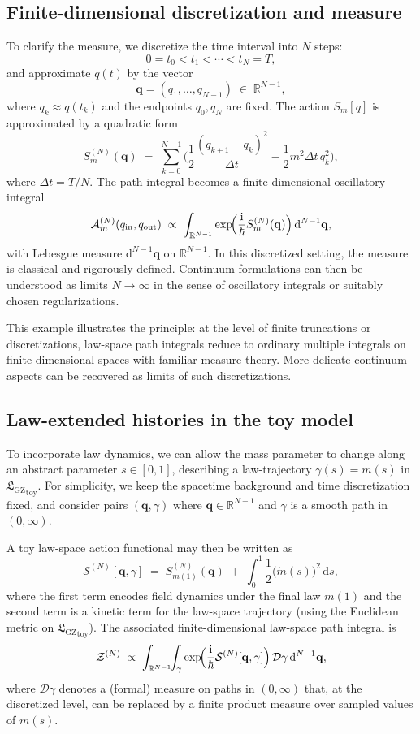 \documentclass[11pt]{book}
\newcommand{\GZLS}{\ensuremath{\mathfrak{L}_{\mathrm{GZ}}}}
\theoremstyle{plain}
\theoremstyle{definition}
\theoremstyle{remark}
\begin{document}
\subsection*{Finite-dimensional discretization and measure}

To clarify the measure, we discretize the time interval into $N$
steps:
\[
   0 = t_0 < t_1 < \cdots < t_N = T,
\]
and approximate $q(t)$ by the vector
\[
   \mathbf{q} = (q_1,\dots,q_{N-1}) \;\in\; \mathbb{R}^{N-1},
\]
where $q_k \approx q(t_k)$ and the endpoints $q_0,q_N$ are fixed.
The action $S_m[q]$ is approximated by a quadratic form
\[
   S_m^{(N)}(\mathbf{q})
   \;=\;
   \sum_{k=0}^{N-1}
   \biggl(
     \frac{1}{2}\frac{(q_{k+1}-q_k)^2}{\Delta t}
     - \frac{1}{2} m^2 \Delta t \, q_k^2
   \biggr),
\]
where $\Delta t = T/N$. The path integral becomes a finite-dimensional
oscillatory integral
\[
   \mathcal{A}_m^{(N)}(q_{\mathrm{in}},q_{\mathrm{out}})
   \;\propto\;
   \int_{\mathbb{R}^{N-1}}
   \exp\!\Bigl(\frac{\mathrm{i}}{\hbar}
   S_m^{(N)}(\mathbf{q})\Bigr)\,\mathrm{d}^{N-1}\mathbf{q},
\]
with Lebesgue measure $\mathrm{d}^{N-1}\mathbf{q}$ on
$\mathbb{R}^{N-1}$. In this discretized setting, the measure is
classical and rigorously defined. Continuum formulations can then be
understood as limits $N\to\infty$ in the sense of oscillatory
integrals or suitably chosen regularizations.

This example illustrates the principle: at the level of finite
truncations or discretizations, law-space path integrals reduce to
ordinary multiple integrals on finite-dimensional spaces with familiar
measure theory. More delicate continuum aspects can be recovered as
limits of such discretizations.

\subsection*{Law-extended histories in the toy model}

To incorporate law dynamics, we can allow the mass parameter to change
along an abstract parameter $s\in[0,1]$, describing a law-trajectory
$\gamma(s)=m(s)$ in \({\GZLS}_{\mathrm{toy}}\). For simplicity, we keep
the spacetime background and time discretization fixed, and consider
pairs $(\mathbf{q},\gamma)$ where $\mathbf{q}\in\mathbb{R}^{N-1}$ and
$\gamma$ is a smooth path in $(0,\infty)$.

A toy law-space action functional may then be written as
\[
   \mathcal{S}^{(N)}[\mathbf{q},\gamma]
   \;=\;
   S_{m(1)}^{(N)}(\mathbf{q})
   \;+\;
   \int_0^1
   \frac{1}{2}\bigl(\dot{m}(s)\bigr)^2\,\mathrm{d}s,
\]
where the first term encodes field dynamics under the final law
$m(1)$ and the second term is a kinetic term for the law-space
trajectory (using the Euclidean metric on \({\GZLS}_{\mathrm{toy}}\)).
The associated finite-dimensional law-space path integral is
\[
   \mathcal{Z}^{(N)}
   \;\propto\;
   \int_{\mathbb{R}^{N-1}}\!\!
   \int_{\gamma}
   \exp\!\Bigl(\frac{\mathrm{i}}{\hbar}
   \mathcal{S}^{(N)}[\mathbf{q},\gamma]\Bigr)\,
   \mathcal{D}\gamma\,\mathrm{d}^{N-1}\mathbf{q},
\]
where $\mathcal{D}\gamma$ denotes a (formal) measure on paths in
$(0,\infty)$ that, at the discretized level, can be replaced by a
finite product measure over sampled values of \(m(s)\).
\end{document}
